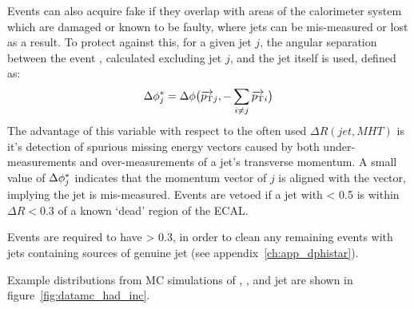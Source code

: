 Events can also acquire fake \mht if they overlap with areas of the calorimeter 
system which are damaged or known to be faulty, where jets can be mis-measured or 
lost as a result. To protect against this, for a given jet $j$, the angular separation
between the event \mht, calculated excluding jet $j$, and the jet itself is used, defined
as:
% 
\begin{equation}
\Delta \phi^*_j = \Delta \phi\big(\overrightarrow{{p_{\text T}}}_j,-\sum_{i\neq j}{\overrightarrow{{p_{\text T}}}_i}\big)
\label{eq:biasdphi}
\end{equation}
% 
The advantage of this variable with respect to the often used
$\Delta R(jet, MHT)$ is it's detection of spurious missing energy vectors caused
by both under-measurements and over-measurements of a jet's transverse momentum.
A small value of $\Delta \phi^*_j$ indicates that the momentum vector of $j$
is aligned with the \mht vector, implying the jet is mis-measured. Events are 
vetoed if a jet with \dphistar< 0.5 is within $\Delta R < 0.3$ of a known
`dead' region of the ECAL.

Events are required to have \dphistar > 0.3, in order to clean any remaining 
events with jets containing sources of genuine \met jet (see
appendix~\ref{ch:app_dphistar}).


Example distributions from MC simulations of \alphat, \HT, \mht and jet \Pt  are
shown in figure~\ref{fig:datamc_had_inc}.

